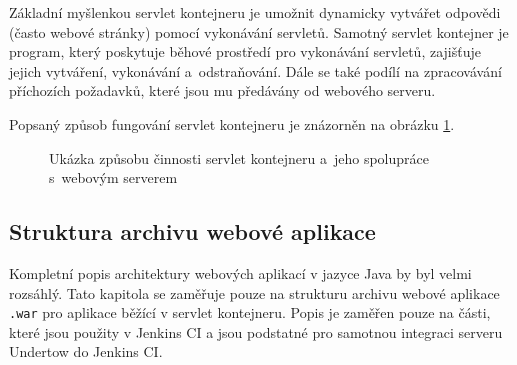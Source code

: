             Základní myšlenkou servlet kontejneru je umožnit dynamicky vytvářet odpovědi (často webové stránky)
            pomocí vykonávání servletů. Samotný servlet kontejner je program, který poskytuje běhové prostředí pro vykonávání servletů,
            zajišťuje jejich vytváření, vykonávání a~odstraňování. Dále se také podílí na zpracovávání příchozích požadavků, které jsou
            mu předávány od webového serveru. 

            Popsaný způsob fungování servlet kontejneru je znázorněn na obrázku \ref{imgServlet}.
            \begin{figure}[ht]
                \begin{center}
                    \caption{Ukázka způsobu činnosti servlet kontejneru a~jeho spolupráce s~webovým serverem \cite{webserverVsServletPage}}
                    \label{imgServlet}
                \end{center}
            \end{figure}   %

        \subsection{Struktura archivu webové aplikace} \label{kapWebXml}
            Kompletní popis architektury webových aplikací v jazyce Java by byl velmi rozsáhlý. 
            Tato kapitola se zaměřuje pouze na strukturu archivu webové aplikace \texttt{.war} pro aplikace běžící v servlet kontejneru.
            Popis je zaměřen pouze na části, které jsou použity v Jenkins CI a jsou podstatné
            pro samotnou integraci serveru Undertow do Jenkins CI.

